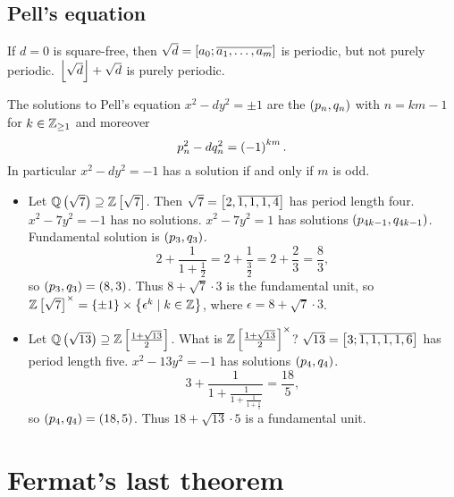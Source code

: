 \subsection{Pell's equation}

If $ d = 0 $ is square-free, then $ \sqrt{d} = \sb{a_0; \overline{a_1, \dots, a_m}} $ is periodic, but not purely periodic. $ \fb{\sqrt{d}} + \sqrt{d} $ is purely periodic.

\begin{theorem}
The solutions to Pell's equation $ x^2 - dy^2 = \pm 1 $ are the $ \rb{p_n, q_n} $ with $ n = km - 1 $ for $ k \in \Z_{\ge 1} $ and moreover
$$ p_n^2 - dq_n^2 = \rb{-1}^{km}. $$
In particular $ x^2 - dy^2 = -1 $ has a solution if and only if $ m $ is odd.
\end{theorem}

\begin{example*}
\hfill
\begin{itemize}
\item Let $ \Q\rb{\sqrt{7}} \supseteq \Z\sb{\sqrt{7}} $. Then $ \sqrt{7} = \sb{2, \overline{1, 1, 1, 4}} $ has period length four. $ x^2 - 7y^2 = -1 $ has no solutions. $ x^2 - 7y^2 = 1 $ has solutions $ \rb{p_{4k - 1}, q_{4k - 1}} $. Fundamental solution is $ \rb{p_3, q_3} $.
$$ 2 + \dfrac{1}{1 + \tfrac{1}{2}} = 2 + \dfrac{1}{\tfrac{3}{2}} = 2 + \dfrac{2}{3} = \dfrac{8}{3}, $$
so $ \rb{p_3, q_3} = \rb{8, 3} $. Thus $ 8 + \sqrt{7} \cdot 3 $ is the fundamental unit, so $ \Z\sb{\sqrt{7}}^\times = \cb{\pm 1} \times \cb{\epsilon^k \mid k \in \Z} $, where $ \epsilon = 8 + \sqrt{7} \cdot 3 $.
\item Let $ \Q\rb{\sqrt{13}} \supseteq \Z\sb{\tfrac{1 + \sqrt{13}}{2}} $. What is $ \Z\sb{\tfrac{1 + \sqrt{13}}{2}}^\times $? $ \sqrt{13} = \sb{3; \overline{1, 1, 1, 1, 6}} $ has period length five. $ x^2 - 13y^2 = -1 $ has solutions $ \rb{p_4, q_4} $.
$$ 3 + \dfrac{1}{1 + \tfrac{1}{1 + \tfrac{1}{1 + \tfrac{1}{1}}}} = \dfrac{18}{5}, $$
so $ \rb{p_4, q_4} = \rb{18, 5} $. Thus $ 18 + \sqrt{13} \cdot 5 $ is a fundamental unit.
\end{itemize}
\end{example*}

\pagebreak

\appendix

\section{Fermat's last theorem}


